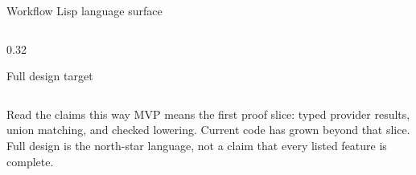 \documentclass[aspectratio=169]{beamer}
\begin{document}
\begin{frame}[shrink=12]{Workflow Lisp language surface}
\begin{columns}[T,totalwidth=\textwidth]
\begin{column}{0.32\textwidth}
\begin{block}{Full design target}
\begin{itemize}
\end{itemize}
\end{block}
\end{column}
\end{columns}
\vspace{0.35em}
\begin{block}{Read the claims this way}
\footnotesize
MVP means the first proof slice: typed provider results, union matching, and checked lowering.
Current code has grown beyond that slice. Full design is the north-star language, not a claim that every listed feature is complete.
\end{block}
\end{frame}
\end{document}
